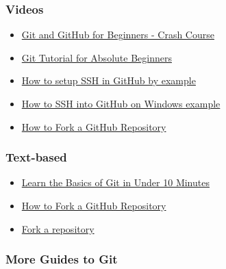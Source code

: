 \documentclass[
  letterpaper,
  DIV=11,
  numbers=noendperiod]{scrreprt}
\providecommand{\tightlist}{%
  \setlength{\itemsep}{0pt}\setlength{\parskip}{0pt}}\usepackage{longtable,booktabs,array}
\begin{document}
\subsubsection{Videos}\label{videos}

\begin{itemize}
\tightlist
\item
  \href{https://www.youtube.com/watch?v=RGOj5yH7evk}{Git and GitHub for
  Beginners - Crash Course}
\item
  \href{https://www.youtube.com/watch?v=CvUiKWv2-C0}{Git Tutorial for
  Absolute Beginners}
\item
  \href{https://www.theserverside.com/blog/Coffee-Talk-Java-News-Stories-and-Opinions/GitHub-SSH-Key-Setup-Config-Ubuntu-Linux}{How
  to setup SSH in GitHub by example}
\item
  \href{https://www.theserverside.com/blog/Coffee-Talk-Java-News-Stories-and-Opinions/GitHub-SSH-Windows-Example}{How
  to SSH into GitHub on Windows example}
\item
  \href{https://www.freecodecamp.org/news/how-to-fork-a-github-repository/}{How
  to Fork a GitHub Repository}
\end{itemize}

\subsubsection{Text-based}\label{text-based}

\begin{itemize}
\tightlist
\item
  \href{https://www.freecodecamp.org/news/learn-the-basics-of-git-in-under-10-minutes-da548267cc91/}{Learn
  the Basics of Git in Under 10 Minutes}
\item
  \href{https://www.freecodecamp.org/news/how-to-fork-a-github-repository/}{How
  to Fork a GitHub Repository}
\item
  \href{https://docs.github.com/en/pull-requests/collaborating-with-pull-requests/working-with-forks/fork-a-repo}{Fork
  a repository}
\end{itemize}

\subsubsection{More Guides to Git}\label{more-guides-to-git}
\end{document}
